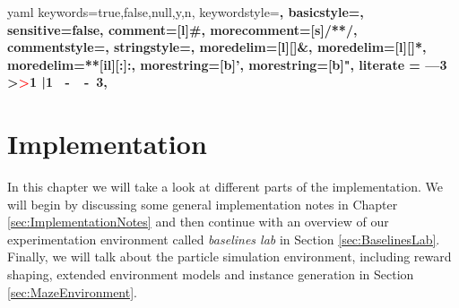 
\newcommand\YAMLcolonstyle{\color{black}\bfseries\small}
\newcommand\YAMLkeystyle{\color{black}\mdseries\small}
\newcommand\YAMLvaluestyle{\color{green}\mdseries\small}

\makeatletter

\newcommand\language@yaml{yaml}

\expandafter\expandafter\expandafter\lstdefinelanguage
\expandafter{\language@yaml}
{
  keywords={true,false,null,y,n},
  keywordstyle=\color{darkgray}\bfseries,
  basicstyle=\YAMLkeystyle,                                 %
  sensitive=false,
  comment=[l]{\#},
  morecomment=[s]{/*}{*/},
  commentstyle=\color{purple}\ttfamily,
  stringstyle=\YAMLvaluestyle\ttfamily,
  moredelim=[l][\color{orange}]{\&},
  moredelim=[l][\color{magenta}]{*},
  moredelim=**[il][\YAMLcolonstyle{:}\YAMLvaluestyle]{:},   %
  morestring=[b]',
  morestring=[b]",
  literate =    {---}{{\ProcessThreeDashes}}3
                {>}{{\textcolor{red}\textgreater}}1     
                {|}{{\textcolor{red}\textbar}}1 
                {\ -\ }{{\mdseries\ -\ }}3,
}

\lst@AddToHook{EveryLine}{\ifx\lst@language\language@yaml\YAMLkeystyle\fi}
\makeatother

\newcommand\ProcessThreeDashes{\llap{\color{cyan}\mdseries-{-}-}}




\lstset{style=mystyle}

\chapter{Implementation} \label{chp:Implementation}
In this chapter we will take a look at different parts of the implementation. We will begin by discussing some general implementation notes in Chapter \ref{sec:ImplementationNotes} and then continue with an overview of our experimentation environment called \textit{baselines lab} in Section \ref{sec:BaselinesLab}. Finally, we will talk about the particle simulation environment, including reward shaping, extended environment models and instance generation in Section \ref{sec:MazeEnvironment}.

